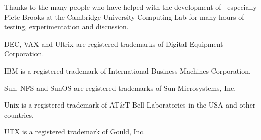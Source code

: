 Thanks to the many people who have helped with the development
of \amd\, especially Piete Brooks at the Cambridge University Computing Lab for
many hours of testing, experimentation and discussion.

\begin{trivlist}
\item[{\sf DEC}, {\sf VAX} and {\sf Ultrix}]
 are registered trademarks of Digital Equipment Corporation.
\item[{\sf IBM}]
is a registered trademark of International Business Machines Corporation.
\item[{\sf Sun}, {\sf NFS} and {\sf SunOS}]
are registered trademarks of Sun Microsystems, Inc.
\item[{\sf Unix}]
is a registered trademark of AT\&T Bell Laboratories in
the USA and other countries.
\item[{\sf UTX}]
is a registered trademark of Gould, Inc.
\end{trivlist}
